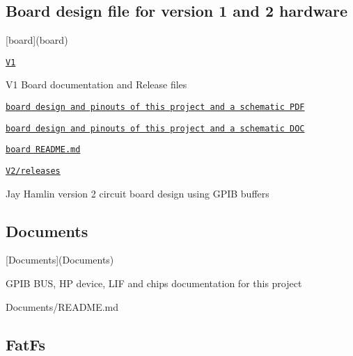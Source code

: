 \subsection*{Board design file for version 1 and 2 hardware}


\begin{DoxyItemize}
\item \mbox{[}board\mbox{]}(board)
\begin{DoxyItemize}
\item \href{board/V1}{\tt V1}
\begin{DoxyItemize}
\item V1 Board documentation and Release files
\item \href{board/V1/HP85Disk.pdf}{\tt board design and pinouts of this project and a schematic P\+DF}
\item \href{board/V1//HP85Disk.doc}{\tt board design and pinouts of this project and a schematic D\+OC}
\item \href{board/V1/HP85Disk.doc}{\tt board R\+E\+A\+D\+M\+E.\+md}
\end{DoxyItemize}
\item \href{V2/releses}{\tt V2/releases}
\begin{DoxyItemize}
\item Jay Hamlin version 2 circuit board design using G\+P\+IB buffers
\end{DoxyItemize}
\end{DoxyItemize}
\end{DoxyItemize}

\subsection*{Documents}


\begin{DoxyItemize}
\item \mbox{[}Documents\mbox{]}(Documents)
\item G\+P\+IB B\+US, HP device, L\+IF and chips documentation for this project
\begin{DoxyItemize}
\item Documents/\+R\+E\+A\+D\+ME.md
\end{DoxyItemize}
\end{DoxyItemize}

\subsection*{Fat\+Fs}


